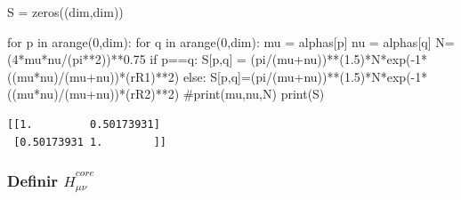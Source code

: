 \documentclass[
  letterpaper,
  DIV=11,
  numbers=noendperiod]{scrreprt}
\newenvironment{Shaded}{\begin{snugshade}}{\end{snugshade}}
\newcommand{\BuiltInTok}[1]{\textcolor[rgb]{0.00,0.23,0.31}{#1}}
\newcommand{\CommentTok}[1]{\textcolor[rgb]{0.37,0.37,0.37}{#1}}
\newcommand{\ControlFlowTok}[1]{\textcolor[rgb]{0.00,0.23,0.31}{#1}}
\newcommand{\DecValTok}[1]{\textcolor[rgb]{0.68,0.00,0.00}{#1}}
\newcommand{\FloatTok}[1]{\textcolor[rgb]{0.68,0.00,0.00}{#1}}
\newcommand{\KeywordTok}[1]{\textcolor[rgb]{0.00,0.23,0.31}{#1}}
\newcommand{\NormalTok}[1]{\textcolor[rgb]{0.00,0.23,0.31}{#1}}
\newcommand{\OperatorTok}[1]{\textcolor[rgb]{0.37,0.37,0.37}{#1}}
\begin{document}
\begin{Shaded}
\begin{Highlighting}[]
\NormalTok{S }\OperatorTok{=}\NormalTok{ zeros((dim,dim))}

\ControlFlowTok{for}\NormalTok{ p }\KeywordTok{in}\NormalTok{ arange(}\DecValTok{0}\NormalTok{,dim):}
    \ControlFlowTok{for}\NormalTok{ q }\KeywordTok{in}\NormalTok{ arange(}\DecValTok{0}\NormalTok{,dim):}
\NormalTok{        mu }\OperatorTok{=}\NormalTok{ alphas[p]}
\NormalTok{        nu }\OperatorTok{=}\NormalTok{ alphas[q]}
\NormalTok{        N}\OperatorTok{=}\NormalTok{(}\DecValTok{4}\OperatorTok{*}\NormalTok{mu}\OperatorTok{*}\NormalTok{nu}\OperatorTok{/}\NormalTok{(pi}\OperatorTok{**}\DecValTok{2}\NormalTok{))}\OperatorTok{**}\FloatTok{0.75}
        \ControlFlowTok{if}\NormalTok{ p}\OperatorTok{==}\NormalTok{q:}
\NormalTok{            S[p,q] }\OperatorTok{=}\NormalTok{ (pi}\OperatorTok{/}\NormalTok{(mu}\OperatorTok{+}\NormalTok{nu))}\OperatorTok{**}\NormalTok{(}\FloatTok{1.5}\NormalTok{)}\OperatorTok{*}\NormalTok{N}\OperatorTok{*}\NormalTok{exp(}\OperatorTok{{-}}\DecValTok{1}\OperatorTok{*}\NormalTok{((mu}\OperatorTok{*}\NormalTok{nu)}\OperatorTok{/}\NormalTok{(mu}\OperatorTok{+}\NormalTok{nu))}\OperatorTok{*}\NormalTok{(rR1)}\OperatorTok{**}\DecValTok{2}\NormalTok{)}
        \ControlFlowTok{else}\NormalTok{:}
\NormalTok{            S[p,q]}\OperatorTok{=}\NormalTok{(pi}\OperatorTok{/}\NormalTok{(mu}\OperatorTok{+}\NormalTok{nu))}\OperatorTok{**}\NormalTok{(}\FloatTok{1.5}\NormalTok{)}\OperatorTok{*}\NormalTok{N}\OperatorTok{*}\NormalTok{exp(}\OperatorTok{{-}}\DecValTok{1}\OperatorTok{*}\NormalTok{((mu}\OperatorTok{*}\NormalTok{nu)}\OperatorTok{/}\NormalTok{(mu}\OperatorTok{+}\NormalTok{nu))}\OperatorTok{*}\NormalTok{(rR2)}\OperatorTok{**}\DecValTok{2}\NormalTok{)}
        \CommentTok{\#print(mu,nu,N)}
\BuiltInTok{print}\NormalTok{(S)}
\end{Highlighting}
\end{Shaded}

\begin{verbatim}
[[1.         0.50173931]
 [0.50173931 1.        ]]
\end{verbatim}

\hypertarget{definir-hathcore_mu-nu}{%
\subsubsection*{\texorpdfstring{Definir
\(\hat{H}^{core}_{\mu \nu}\)}{Definir \textbackslash hat\{H\}\^{}\{core\}\_\{\textbackslash mu \textbackslash nu\}}}\label{definir-hathcore_mu-nu}}
\end{document}
